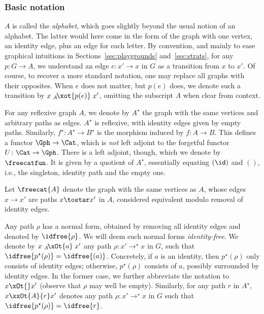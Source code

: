 \documentclass{LMCS}
\theoremstyle{plain}\newtheorem{satz}[thm]{Satz}
\begin{document}
\subsubsection{Basic notation}\label{subsubsec:notation:lts} $A$ is called the \emph{alphabet}, which goes
slightly beyond the usual notion of an alphabet. The latter would here
come in the form of the graph with one vertex, an identity edge, plus
an edge for each letter.  By convention, and mainly to ease graphical
intuitions in Sections~\ref{sec:playgrounds} and~\ref{sec:strats}, for
any \lts{} $p \colon G \to A$, we understand an edge $e \colon x' \to
x$ in $G$ as a transition from $x$ to $x'$. Of course, to recover a
more standard notation, one may replace all graphs with their
opposites.  When $e$ does not matter, but $p(e)$ does, we denote such
a transition by $x \mathrel{{}_{A}\!\xot{p(e)}} x'$, omitting the
subscript $A$ when clear from context.

For any reflexive graph $A$, we denote by $A^\star$ the graph with the
same vertices and arbitrary paths as edges. $A^\star$ is reflexive,
with identity edges given by empty paths. Similarly, $f^\star \colon
A^\star \to B^\star$ is the morphism induced by $f \colon A \to B$.
This defines a functor $\Gph \to \Cat$, which is \emph{not} left
adjoint to the forgetful functor $U \colon \Cat \to \Gph$.  There is a
left adjoint, though, which we denote by $\freecatfun$. It is given by
a quotient of $A^\star$, essentially equating $(\id)$ and $()$, i.e.,
the singleton, identity path and the empty one.
\begin{defi}
  Let $\freecat{A}$ denote the graph with the same vertices as $A$,
  whose edges $x \to x'$ are paths $x \tostar x'$ in $A$, considered
  equivalent modulo removal of identity edges.
\end{defi}
Any path $\rho$ has a normal form, obtained by removing all identity
edges and denoted by $\idfree{\rho}$.  We will deem such normal forms
\emph{identity-free}.  We denote by $x \mathrel{{}_{A}\!\xOt{a}} x'$
any path $\rho \colon x' \to^\star x$ in $G$, such that
$\idfree{p^\star(\rho)} = \idfree{(a)}$.  Concretely, if $a$ is an
identity, then $p^\star(\rho)$ only consists of identity edges;
otherwise, $p^\star(\rho)$ consists of $a$, possibly surrounded by
identity edges. In the former case, we further abbreviate the notation
to $x \xOt{} x'$ (observe that $\rho$ may well be empty).  Similarly,
for any path $r$ in $A^\star$, $x \xxOt{A}{r} x'$ denotes any path
$\rho \colon x' \to^\star x$ in $G$ such that $\idfree{p^\star (\rho)}
= \idfree{r}$.
\end{document}
